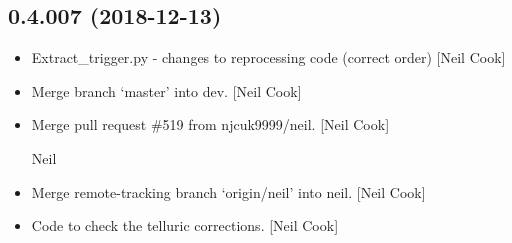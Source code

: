 \documentclass[a4paper,10pt,english]{report}
\begin{document}
\subsection{0.4.007 (2018-12-13)}
\label{\detokenize{misc/changelog:id235}}\begin{itemize}
\item {} 
Extract\_trigger.py - changes to reprocessing code (correct order)
{[}Neil Cook{]}

\item {} 
Merge branch ‘master’ into dev. {[}Neil Cook{]}

\item {} 
Merge pull request \#519 from njcuk9999/neil. {[}Neil Cook{]}

Neil

\item {} 
Merge remote-tracking branch ‘origin/neil’ into neil. {[}Neil Cook{]}

\item {} 
Code to check the telluric corrections. {[}Neil Cook{]}

\end{itemize}
\end{document}
